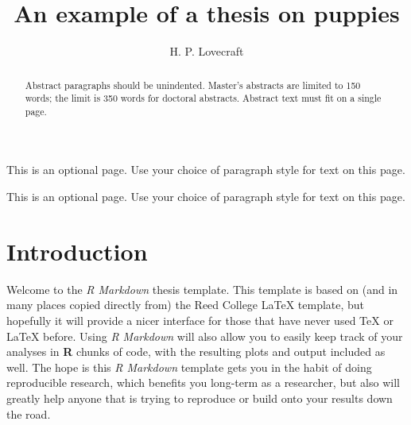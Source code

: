 \documentclass{sfuthesis}
\title{An example of a thesis on puppies}
\author{H. P. Lovecraft}
\begin{document}
\frontmatter
\maketitle{}
\makecommittee{}


\begin{abstract}
Abstract paragraphs should be unindented. Master's abstracts are limited to 150 words; the limit is 350 words for doctoral abstracts. Abstract text must fit on a single page.
\end{abstract}


\begin{dedication}
This is an optional page. Use your choice of paragraph style for text on this page. \end{dedication}


\begin{acknowledgements}
This is an optional page. Use your choice of paragraph style for text on this page. \end{acknowledgements}

%
\tableofcontents%
\clearpage

%
\listoftables
\clearpage

%
\listoffigures
\clearpage





%
%

\mainmatter%

\hypertarget{introduction}{%
\section*{Introduction}\label{introduction}}

Welcome to the \emph{R Markdown} thesis template. This template is based on (and in many places copied directly from) the Reed College LaTeX template, but hopefully it will provide a nicer interface for those that have never used TeX or LaTeX before. Using \emph{R Markdown} will also allow you to easily keep track of your analyses in \textbf{R} chunks of code, with the resulting plots and output included as well. The hope is this \emph{R Markdown} template gets you in the habit of doing reproducible research, which benefits you long-term as a researcher, but also will greatly help anyone that is trying to reproduce or build onto your results down the road.
\end{document}
